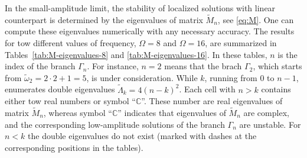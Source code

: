 In the small-amplitude limit, the stability of localized solutions with linear counterpart is determined by the eigenvalues of matrix $\widetilde{M}_n$, see \eqref{eq:M}.
One can compute these eigenvalues numerically with any necessary accuracy.
The results for tow different values of frequency, $\Omega = 8$ and $\Omega = 16$, are summarized in Tables~\ref{tab:M-eigenvalues-8} and \ref{tab:M-eigenvalues-16}.
In these tables, $n$ is the index of the branch $\Gamma_n$.
For instance, $n = 2$ means that the brach $\Gamma_2$, which starts from $\tilde{\omega}_2 = 2 \cdot 2 + 1 = 5$, is under consideration.
While $k$, running from $0$ to $n - 1$, enumerates double eigenvalues $\widetilde{\Lambda}_k = 4(n - k)^2$.
Each cell with $n > k$ contains either tow real numbers or symbol ``$\mathbb{C}$''.
These number are real eigenvalues of matrix $\widetilde{M}_n$, whereas symbol ``$\mathbb{C}$'' indicates that eigenvalues of $\widetilde{M}_n$ are complex, and the corresponding low-amplitude solutions of the branch $\Gamma_n$ are unstable.
For $n < k$ the double eigenvalues do not exist (marked with dashes at the corresponding positions in the tables).

